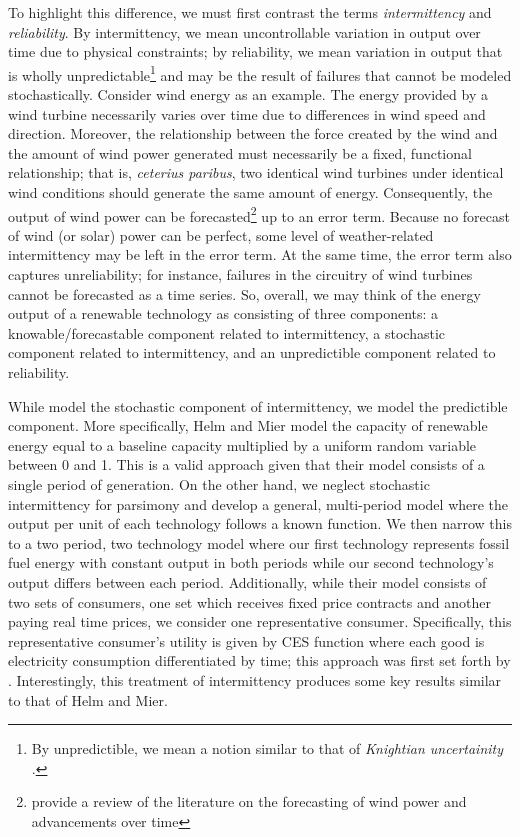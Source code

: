 \documentclass[11pt,a4paper]{extarticle}
\begin{document}
To highlight this difference, we must first contrast the terms  \textit{intermittency} and \textit{reliability}. By intermittency, we mean uncontrollable variation in output over time due to physical constraints; by reliability, we mean variation in output that is wholly unpredictable\footnote{By unpredictible, we mean a notion similar to that of \textit{Knightian uncertainity} \citep{Knight}. } and may be the result of failures that cannot be modeled stochastically. Consider wind energy as an example. The energy provided by a wind turbine necessarily varies over time due to differences in wind speed and direction. Moreover, the relationship between the force created by the wind and the amount of wind power generated must necessarily be a fixed, functional relationship; that is, \textit{ceterius paribus}, two identical wind turbines under identical wind conditions should generate the same amount of energy. Consequently, the output of wind power can be forecasted\footnote{\citet{Foley2012} provide a review of the literature on the forecasting of wind power and advancements over time} up to an error term. Because no forecast of wind (or solar) power can be perfect, some level of weather-related intermittency may be left in the error term. At the same time, the error term also captures unreliability; for instance, failures in the circuitry of wind turbines cannot be forecasted as a time series. So, overall, we may think of the energy output of a renewable technology as consisting of three components: a knowable/forecastable component related to intermittency, a stochastic component related to intermittency, and an unpredictible component related to reliability. 

While \citet{HH} model the stochastic component of intermittency, we model the predictible component. More specifically, Helm and Mier model the capacity of renewable energy equal to a baseline capacity multiplied by a uniform random variable between 0 and 1. This is a valid approach given that their model consists of a single period of generation. On the other hand, we neglect stochastic intermittency for parsimony and develop a general, multi-period model where the output per unit of each technology follows a known function.  We then narrow this to a two period, two technology model where our first technology represents fossil fuel energy with constant output in both periods while our second technology's output differs between each period. Additionally, while their model consists of two sets of consumers, one set which receives fixed price contracts and another paying real time prices, we consider one representative consumer. Specifically, this representative consumer's utility is given by CES function where each good is electricity consumption differentiated by time; this approach was first set forth by \citet{Moha2016}. Interestingly, this treatment of intermittency produces some key results similar to that of Helm and Mier. 
\end{document}
